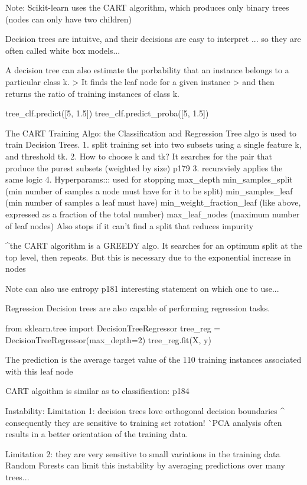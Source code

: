 Note:
Scikit-learn uses the CART algorithm,
which produces only binary trees (nodes can only have two children)

Decision trees are intuitve,
and their decisions are easy to interpret
... so they are often called white box models...

A decision tree can also estimate the porbability
that an instance belongs to a particular class k.
> It finds the leaf node for a given instance
> and then returns the ratio of training instances of class k.

tree_clf.predict([5, 1.5]) 
tree_clf.predict_proba([5, 1.5])

The CART Training Algo:
the Classification and Regression Tree algo is used to train Decision Trees.
1. split training set into two subsets using a single feature k, and threshold tk.
2. How to choose k and tk?
It searches for the pair that produce the purest subsets (weighted by size)
p179
3. recursviely applies the same logic
4. Hyperparams::: used for stopping
max_depth
min_samples_split (min number of samples a node must have for it to be split)
min_samples_leaf (min number of samples a leaf must have)
min_weight_fraction_leaf (like above, expressed as a fraction of the total number)
max_leaf_nodes (maximum number of leaf nodes)
Also stops if it can't find a split that reduces impurity

^the CART algorithm is a GREEDY algo.
It searches for an optimum split at the top level, then repeats.
But this is necessary due to the exponential increase in nodes

Note can also use entropy p181
interesting statement on which one to use...

Regression
Decision trees are also capable of performing regression tasks.

from sklearn.tree import DecisionTreeRegressor
tree_reg = DecisionTreeRegressor(max_depth=2)
tree_reg.fit(X, y)

The prediction is the average target value of the
110 training instances associated with this leaf node

CART algoithm is similar as to classification: p184

Instability:
Limitation 1: decision trees love orthogonal decision boundaries
^ consequently they are sensitive to training set rotation!
^^ PCA analysis often results in a better orientation of the training data.

Limitation 2: they are very sensitive to small variations in the training data
Random Forests can limit this instability by averaging predictions over many trees...

